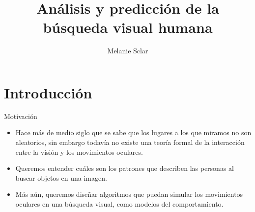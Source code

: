 \documentclass[compress]{beamer}
\title[Defensa de tesis de licenciatura] %
{Análisis y predicción de la búsqueda visual humana}
\author[Melanie Sclar] %
{Melanie Sclar\\ \medskip{\small Directores: Dr. Juan Kamienkowski y Dr. Guillermo Solovey \medskip}}
\institute[UBA] %
{
  Facultad de Ciencias Exactas y Naturales\\
  Universidad de Buenos Aires
}
\begin{document}
\begin{frame}
  \titlepage
\end{frame}


\section{Introducción}
\begin{frame}{Motivación}
\begin{itemize}
\item Hace más de medio siglo que se sabe que los lugares a los que miramos no son aleatorios, sin embargo todavía no existe una teoría formal de la interacción entre la visión y los movimientos oculares.
\item Queremos entender cuáles son los patrones que describen las personas al buscar objetos en una imagen.
\item Más aún, queremos diseñar algoritmos que puedan simular los movimientos oculares en una búsqueda visual, como modelos del comportamiento.
\end{itemize}
\end{frame}
\end{document}
